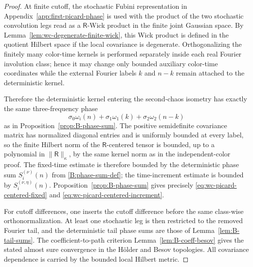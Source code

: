 \documentclass[10pt]{amsart}
\numberwithin{equation}{section}
\theoremstyle{plain}
\theoremstyle{definition}
\theoremstyle{remark}
\begin{document}
\begin{proof}
At finite cutoff, the stochastic Fubini representation in Appendix~\ref{app:first-picard-phase} is used with the product of the two stochastic convolution legs read as a \(\mathsf R\)-Wick product in the finite joint Gaussian space.  By Lemma~\ref{lem:wc-degenerate-finite-wick}, this Wick product is defined in the quotient Hilbert space if the local covariance is degenerate.  Orthogonalizing the finitely many color-time kernels is performed separately inside each real Fourier involution class; hence it may change only bounded auxiliary color-time coordinates while the external Fourier labels \(k\) and \(n-k\) remain attached to the deterministic kernel.

Therefore the deterministic kernel entering the second-chaos isometry has exactly the same three-frequency phase
\[
        \sigma_0\omega_i(n)+\sigma_1\omega_1(k)+\sigma_2\omega_2(n-k)
\]
as in Proposition~\ref{prop:B-phase-sum}.  The positive semidefinite covariance matrix has normalized diagonal entries and is uniformly bounded at every label, so the finite Hilbert norm of the \(\mathsf R\)-centered tensor is bounded, up to a polynomial in \(\|\mathsf R\|_\kappa\), by the same kernel norm as in the independent-color proof.  The fixed-time estimate is therefore bounded by the deterministic phase sum \(S_i^{(\nu)}(n)\) from \eqref{B:phase-sum-def}; the time-increment estimate is bounded by \(S_i^{(\nu,\eta)}(n)\).  Proposition~\ref{prop:B-phase-sum} gives precisely \eqref{eq:wc-picard-centered-fixed} and \eqref{eq:wc-picard-centered-increment}.

For cutoff differences, one inserts the cutoff difference before the same class-wise orthonormalization.  At least one stochastic leg is then restricted to the removed Fourier tail, and the deterministic tail phase sums are those of Lemma~\ref{lem:B-tail-sums}.  The coefficient-to-path criterion Lemma~\ref{lem:B-coeff-besov} gives the stated almost sure convergence in the H\"older and Besov topologies.  All covariance dependence is carried by the bounded local Hilbert metric.
\end{proof}
\end{document}
